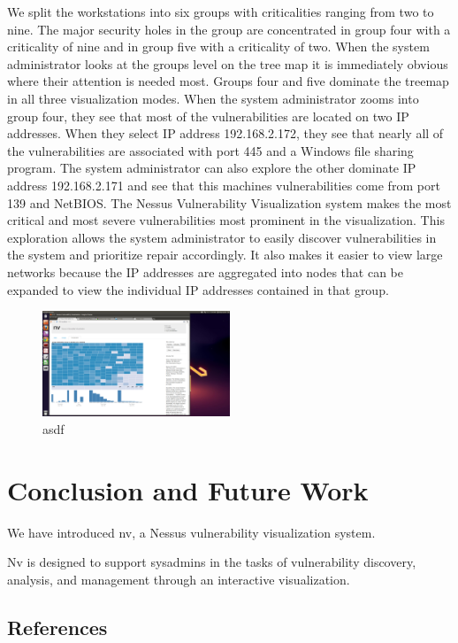 \documentclass{acm_proc_article-sp}
\begin{document}
We split the workstations into six groups with criticalities ranging from two to
nine.  The major security holes in the group are concentrated in group four with a
criticality of nine and in group five with a criticality of two.  When the
system administrator looks at the groups level on the tree map it is immediately
obvious where their attention is needed most. Groups four and five dominate the
treemap in all three visualization modes. When the system administrator zooms
into group four, they see that most of the vulnerabilities are located on two IP
addresses. When they select IP address 192.168.2.172, they see that nearly all of
the vulnerabilities are associated with port 445 and a Windows file sharing
program. The system administrator can also explore the other dominate IP address 192.168.2.171 and
see that this machines vulnerabilities come from port 139 and NetBIOS. The
Nessus Vulnerability Visualization system makes the most critical and most
severe vulnerabilities most prominent in the visualization. This
exploration allows the system administrator to easily discover vulnerabilities
in the system and prioritize repair accordingly. It also makes it easier to view large
networks because the IP addresses are aggregated into nodes that can be expanded to view
the individual IP addresses contained in that group.


\begin{figure}
  \centering
  \includegraphics[width=0.5\textwidth]{../screenshots/final/VASTWorkstationPort}
  \caption{asdf}
\end{figure}

\section{Conclusion and Future Work}

We have introduced nv, a Nessus vulnerability visualization system.

Nv is designed to support sysadmins in the tasks of vulnerability discovery, analysis, and management through an interactive visualization.





\subsection{References}
\end{document}
